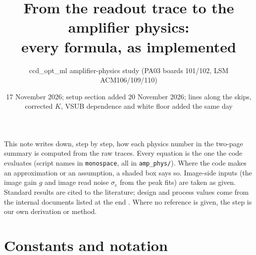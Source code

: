 \documentclass[10pt,a4paper]{article}
\title{From the readout trace to the amplifier physics:\\ every formula, as implemented}
\author{ccd\_opt\_ml amplifier-physics study (PA03 boards 101/102, LSM ACM106/109/110)}
\date{17 November 2026; setup section added 20 November 2026; lines along the skips, corrected $K$, VSUB dependence and white floor added the same day}
\newcommand{\code}[1]{\texttt{\small #1}}
\begin{document}
\maketitle

\noindent This note writes down, step by step, how each physics number in the two-page summary is computed from the raw
traces. Every equation is the one the code evaluates (script names in \code{monospace}, all in \code{amp\_phys/}).
Where the code makes an approximation or an assumption, a shaded box says so. Image-side inputs (the image gain
$g$ and image read noise $\sigma_e$ from the peak fits) are taken as given. Standard results are cited to the
literature; design and process values come from the internal documents listed at the end
\cite{recipe,acmguide,feschem,micrograph}. Where no reference is given, the step is our own derivation or method.

\tableofcontents

\section{Constants and notation}
\end{document}
